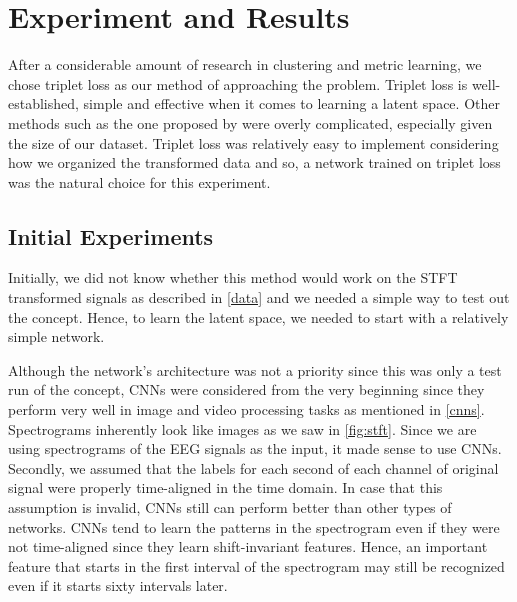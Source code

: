 \chapter{Experiment and Results}
\label{expres}

After a considerable amount of research in clustering and metric learning, we chose triplet loss as our method of approaching the problem. Triplet loss is well-established, simple and effective when it comes to learning a latent space. Other methods such as the one proposed by \citet{lifted_structure_embedding} were overly complicated, especially given the size of our dataset. Triplet loss was relatively easy to implement considering how we organized the transformed data and so, a network trained on triplet loss was the natural choice for this experiment. 

\section{Initial Experiments}

Initially, we did not know whether this method would work on the STFT transformed signals as described in \cref{data} and we needed a simple way to test out the concept. Hence, to learn the latent space, we needed to start with a relatively simple network. 

Although the network's architecture was not a priority since this was only a test run of the concept, CNNs were considered from the very beginning since they perform very well in image and video processing tasks as mentioned in \cref{cnns}. Spectrograms inherently look like images as we saw in \cref{fig:stft}. Since we are using spectrograms of the EEG signals as the input, it made sense to use CNNs. Secondly, we assumed that the labels for each second of each channel of original signal were properly time-aligned in the time domain. In case that this assumption is invalid, CNNs still can perform better than other types of networks. CNNs tend to learn the patterns in the spectrogram even if they were not time-aligned since they learn shift-invariant features. Hence, an important feature that starts in the first interval of the spectrogram may still be recognized even if it starts sixty intervals later.

